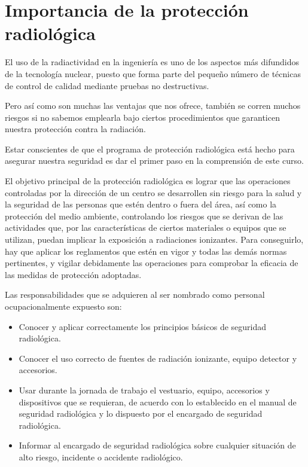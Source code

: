 \chapter{Importancia de la protección radiológica}

El uso de la radiactividad en la ingeniería es uno de los aspectos más difundidos de la tecnología nuclear, puesto que forma parte del pequeño número de técnicas de control de calidad mediante pruebas no destructivas.

Pero así como son muchas las ventajas que nos ofrece, también se corren muchos riesgos si no sabemos emplearla bajo ciertos procedimientos que garanticen nuestra protección contra la radiación.

Estar conscientes de que el programa de protección radiológica está hecho para asegurar nuestra seguridad es dar el primer paso en la comprensión de este curso.

El objetivo principal de la protección radiológica es lograr que las operaciones controladas por la dirección de un centro se desarrollen sin riesgo para la salud y la seguridad de las personas que estén dentro o fuera del área, así como la protección del medio ambiente, controlando los riesgos que se derivan de las actividades que, por las características de ciertos materiales o equipos que se utilizan, puedan implicar la exposición a radiaciones ionizantes. Para conseguirlo, hay que aplicar los reglamentos que estén en vigor y todas las demás normas pertinentes, y vigilar debidamente las operaciones para comprobar la eficacia de las medidas de protección adoptadas.

Las responsabilidades que se adquieren al ser nombrado como personal ocupacionalmente expuesto son:

\begin{itemize}
  \item Conocer y aplicar correctamente los principios básicos de seguridad radiológica.
  \item Conocer el uso correcto de fuentes de radiación ionizante, equipo detector y accesorios.
  \item Usar durante la jornada de trabajo el vestuario, equipo, accesorios y dispositivos que se requieran, de acuerdo con lo establecido en el manual de seguridad radiológica y lo dispuesto por el encargado de seguridad radiológica.
  \item Informar al encargado de seguridad radiológica sobre cualquier situación de alto riesgo, incidente o accidente radiológico.
\end{itemize}
